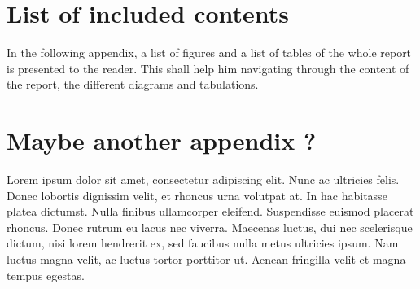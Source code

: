 \newpage
\appendix
\thispagestyle{empty}

\section{List of included contents}
\label{appendix:contents}

In the following appendix, a list of figures and a list of tables of the whole report is presented to the reader. This shall help him navigating through the content of the report, the different diagrams and tabulations.

\listoftables
\listoffigures

\section{Maybe another appendix ?}
\label{appendix:another}

Lorem ipsum dolor sit amet, consectetur adipiscing elit. Nunc ac ultricies felis. Donec lobortis dignissim velit, et rhoncus urna volutpat at. In hac habitasse platea dictumst. Nulla finibus ullamcorper eleifend. Suspendisse euismod placerat rhoncus. Donec rutrum eu lacus nec viverra. Maecenas luctus, dui nec scelerisque dictum, nisi lorem hendrerit ex, sed faucibus nulla metus ultricies ipsum. Nam luctus magna velit, ac luctus tortor porttitor ut. Aenean fringilla velit et magna tempus egestas.